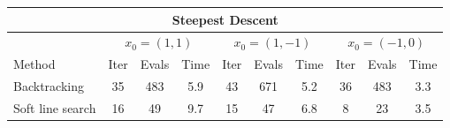 \begin{tabular}{l|ccc|ccc|ccc} 
\multicolumn{10}{c}{Steepest Descent} \\ \hline \hline
 & \multicolumn{3}{c}{$x_0 = (1,1)$} & \multicolumn{3}{c}{$x_0 = (1,-1)$} & \multicolumn{3}{c}{$x_0 = (-1,0)$} \\ 
\normalsize Method & Iter & Evals & Time & Iter & Evals & Time & Iter & Evals & Time \\ \hline 
Backtracking & 35 & 483 & 5.9 & 43 & 671 & 5.2 & 36 & 483 & 3.3\\
Soft line search &  16 & 49 & 9.7 & 15 & 47 & 6.8 & 8 & 23 & 3.5\\ \hline \hline
\end{tabular}
